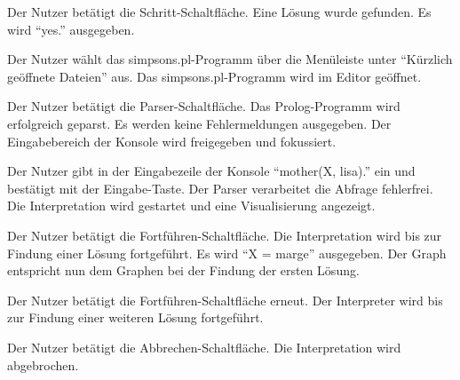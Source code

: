 \documentclass[parskip=full,11pt,twoside]{scrartcl}
\begin{document}
{Der Nutzer betätigt die Schritt-Schaltfläche.}
{Eine Lösung wurde gefunden. Es wird \enquote{yes.} ausgegeben.}



{Der Nutzer wählt das simpsons.pl-Programm über die Menüleiste unter \enquote{Kürzlich geöffnete Dateien} aus.}
{Das simpsons.pl-Programm wird im Editor geöffnet.}

{Der Nutzer betätigt die Parser-Schaltfläche.}
{Das Prolog-Programm wird erfolgreich geparst. Es werden keine Fehlermeldungen ausgegeben. Der Eingabebereich der Konsole wird freigegeben und fokussiert.}

{Der Nutzer gibt in der Eingabezeile der Konsole \enquote{mother(X, lisa).} ein und bestätigt mit der Eingabe-Taste.}
{Der Parser verarbeitet die Abfrage fehlerfrei. Die Interpretation wird gestartet und eine Visualisierung angezeigt.}

{Der Nutzer betätigt die Fortführen-Schaltfläche.}
{Die Interpretation wird bis zur Findung einer Lösung fortgeführt. Es wird \enquote{X = marge} ausgegeben. Der Graph entspricht nun dem Graphen bei der Findung der ersten Lösung.}

{Der Nutzer betätigt die Fortführen-Schaltfläche erneut.}
{Der Interpreter wird bis zur Findung einer weiteren Lösung fortgeführt.}

{Der Nutzer betätigt die Abbrechen-Schaltfläche.}
{Die Interpretation wird abgebrochen.}
\end{document}
